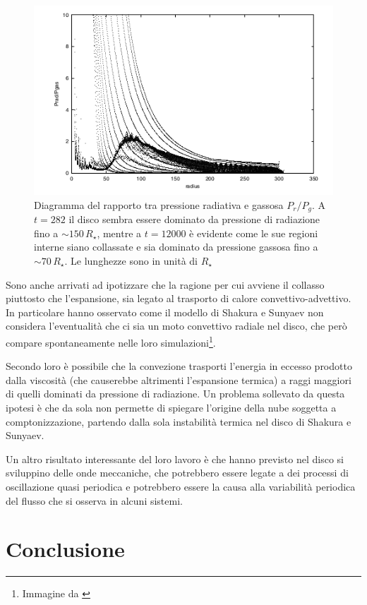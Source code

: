 \documentclass[a4paperbi]{article}
\begin{document}
	\begin{figure}[H]
		\centering
		\includegraphics[width=0.8\linewidth]{CollassoDisco2}
		\caption{Diagramma del rapporto tra pressione radiativa e gassosa $P_r/P_g$. A $t=282$ il disco sembra essere dominato da pressione di radiazione fino a $\sim150\,R_\star$, mentre a $t=12000$ è evidente come le sue regioni interne siano collassate e sia dominato da pressione gassosa fino a $\sim70\,R_\star$. Le lunghezze sono in unità di $R_\star$}
		\label{fig:CollassoDisco2}
	\end{figure}
	
	Sono anche arrivati ad ipotizzare che la ragione per cui avviene il collasso piuttosto che l'espansione, sia legato al trasporto di calore convettivo-advettivo. In particolare hanno osservato come il modello di Shakura e Sunyaev non considera l'eventualità che ci sia un moto convettivo radiale nel disco, che però compare spontaneamente nelle loro simulazioni\footnote{Immagine da \cite{TeresiMolteniToscano2004}}.	
	
	Secondo loro è possibile che la convezione trasporti l'energia in eccesso prodotto dalla viscosità (che causerebbe altrimenti l'espansione termica) a raggi maggiori di quelli dominati da pressione di radiazione. Un problema sollevato da questa ipotesi è che da sola non permette di spiegare l'origine della nube soggetta a comptonizzazione, partendo dalla sola instabilità termica nel disco di Shakura e Sunyaev.
	
	Un altro risultato interessante del loro lavoro è che hanno previsto nel disco si sviluppino delle onde meccaniche, che potrebbero essere legate a dei processi di oscillazione quasi periodica e potrebbero essere la causa alla variabilità periodica del flusso che si osserva in alcuni sistemi.

\newpage
\section{Conclusione}
\end{document}
